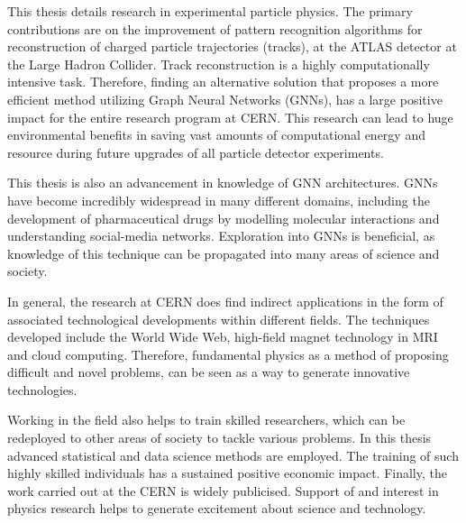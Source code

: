This thesis details research in experimental particle physics. The primary contributions are on the improvement of pattern recognition algorithms for reconstruction of charged particle trajectories (tracks), at the ATLAS detector at the Large Hadron Collider. Track reconstruction is a highly computationally intensive task. Therefore, finding an alternative solution that proposes a more efficient method utilizing Graph Neural Networks (GNNs), has a large positive impact for the entire research program at CERN. This research can lead to huge environmental benefits in saving vast amounts of computational energy and resource during future upgrades of all particle detector experiments.

This thesis is also an advancement in knowledge of GNN architectures. GNNs have become incredibly widespread in many different domains, including the development of pharmaceutical drugs by modelling molecular interactions and understanding social-media networks. Exploration into GNNs is beneficial, as knowledge of this technique can be propagated into many areas of science and society.

In general, the research at CERN does find indirect applications in the form of associated technological developments within different fields. The techniques developed include the World Wide Web, high-field magnet technology in MRI and cloud computing. Therefore, fundamental physics as a method of proposing difficult and novel problems, can be seen as a way to generate innovative technologies.

Working in the field also helps to train skilled researchers, which can be redeployed to other areas of society to tackle various problems. In this thesis advanced statistical and data science methods are employed. The training of such highly skilled individuals has a sustained positive economic impact. Finally, the work carried out at the CERN is widely publicised. Support of and interest in physics research helps to generate excitement about science and technology.
